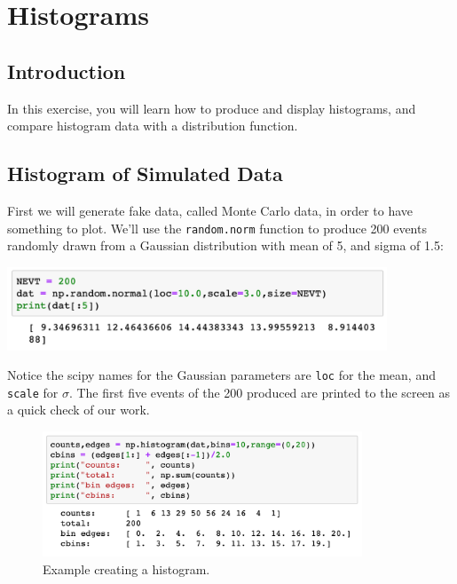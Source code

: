 \chapter{Histograms}

\section{Introduction}

In this exercise, you will learn how to produce and display
histograms, and compare histogram data with a distribution function.

\section{Histogram of Simulated Data}

First we will generate fake data, called Monte Carlo data, in order to
have something to plot.  We'll use the {\tt random.norm} function to
produce 200 events randomly drawn from a Gaussian distribution with
mean of 5, and sigma of 1.5:
\begin{center}
\includegraphics[width=0.85\textwidth]{figs/histograms/mc.png}\\ 
\end{center}
Notice the scipy names for the Gaussian parameters are {\tt loc} for
the mean, and {\tt scale} for $\sigma$.  The first five events of the
200 produced are printed to the screen as a quick check of our work.

\begin{figure}[htbp]
\begin{center}
\includegraphics[width=0.85\textwidth]{figs/histograms/hist.png} 
\end{center}
\caption{\label{fig:hist} Example creating a histogram.}
\end{figure}

